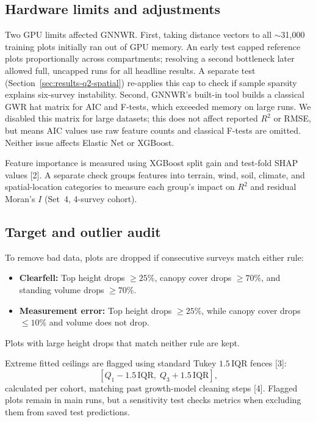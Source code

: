 \documentclass[logo,msc,ai]{infthesis}           %
\begin{document}
\subsection*{Hardware limits and adjustments}
Two GPU limits affected GNNWR. First, taking distance vectors to all $\sim$31,000 training plots initially ran out of GPU memory. An early test capped reference plots proportionally across compartments; resolving a second bottleneck later allowed full, uncapped runs for all headline results. A separate test (Section~\ref{sec:results-q2-spatial}) re-applies this cap to check if sample sparsity explains six-survey instability. Second, GNNWR's built-in tool builds a classical GWR hat matrix for AIC and F-tests, which exceeded memory on large runs. We disabled this matrix for large datasets; this does not affect reported $R^2$ or RMSE, but means AIC values use raw feature counts and classical F-tests are omitted. Neither issue affects Elastic Net or XGBoost.

Feature importance is measured using XGBoost split gain and test-fold SHAP values [2]. A separate check groups features into terrain, wind, soil, climate, and spatial-location categories to measure each group's impact on $R^2$ and residual Moran's $I$ (Set~4, 4-survey cohort).

\subsection*{Target and outlier audit}
To remove bad data, plots are dropped if consecutive surveys match either rule:
\begin{itemize}
\setlength\itemsep{2pt}
\item \textbf{Clearfell:} Top height drops $\ge 25\%$, canopy cover drops $\ge 70\%$, and standing volume drops $\ge 70\%$.
\item \textbf{Measurement error:} Top height drops $\ge 25\%$, while canopy cover drops $\le 10\%$ and volume does not drop.
\end{itemize}
Plots with large height drops that match neither rule are kept.

Extreme fitted ceilings are flagged using standard Tukey $1.5\,\mathrm{IQR}$ fences [3]:
\begin{equation}
\left[Q_1 - 1.5\,\mathrm{IQR},\; Q_3 + 1.5\,\mathrm{IQR}\right],
\label{eq:tukey-fences}
\end{equation}
calculated per cohort, matching past growth-model cleaning steps [4]. Flagged plots remain in main runs, but a sensitivity test checks metrics when excluding them from saved test predictions.
\end{document}
